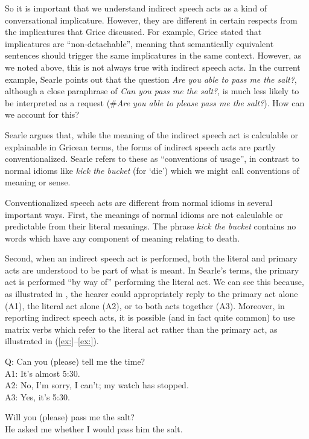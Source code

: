 So it is important that we understand indirect speech acts as a kind of conversational implicature. However, they are different in certain respects from the implicatures that Grice discussed. For example, Grice stated that implicatures are “non-detachable”, meaning that semantically equivalent sentences should trigger the same implicatures in the same context. However, as we noted above, this is not always true with indirect speech acts. In the current example, Searle points out that the question \textit{Are you able to pass me the salt?}, although a close paraphrase of \textit{Can you pass me the salt?}, is much less likely to be interpreted as a request (\#\textit{Are you able to please pass me the salt?}). How can we account for this?



Searle argues that, while the meaning of the indirect speech act is calculable or explainable in Gricean terms, the forms of indirect speech acts are partly conventionalized. Searle refers to these as “conventions of usage”, in contrast to normal idioms like \textit{kick the bucket} (for ‘die’) which we might call conventions of meaning or sense.



Conventionalized speech acts are different from normal idioms in several important ways. First, the meanings of normal idioms are not calculable or predictable from their literal meanings. The phrase \textit{kick the bucket} contains no words which have any component of meaning relating to death.



Second, when an indirect speech act is performed, both the literal and primary acts are understood to be part of what is meant. In Searle’s terms, the primary act is performed “by way of” performing the literal act. We can see this because, as illustrated in , the hearer could appropriately reply to the primary act alone (A1), the literal act alone (A2), or to both acts together (A3). Moreover, in reporting indirect speech acts, it is possible (and in fact quite common) to use matrix verbs which refer to the literal act rather than the primary act, as illustrated in (\ref{ex:}--\ref{ex:}).


\ea
Q: Can you (please) tell me the time?\\
A1: It’s almost 5:30.\\
A2: No, I’m sorry, I can’t; my watch has stopped.\\
A3: Yes, it’s 5:30.
\z

\ea
\ea Will you (please) pass me the salt?\\
\ex He asked me whether I would pass him the salt.
                       \z
\z


